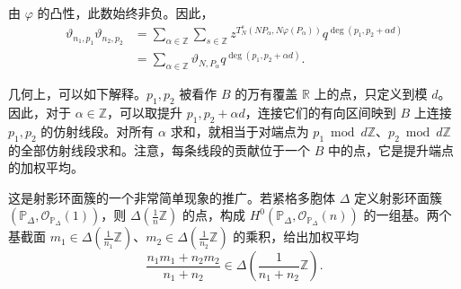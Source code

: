 由 $\varphi$ 的凸性，此数始终非负。因此，
\[
\begin{aligned}
\vartheta_{n_1,p_1}\vartheta_{n_2,p_2}
&=\sum_{\alpha\in\mathbb Z}\sum_{s\in\mathbb Z}
z^{T_N^s(NP_\alpha,N\varphi(P_\alpha))}
q^{\deg(p_1,p_2+\alpha d)}\\
&=\sum_{\alpha\in\mathbb Z}
\vartheta_{N,P_\alpha}q^{\deg(p_1,p_2+\alpha d)}.
\end{aligned}
\]

几何上，可以如下解释。$p_1,p_2$ 被看作 $B$ 的万有覆盖 $\mathbb R$ 上的点，只定义到模 $d$。因此，对于 $\alpha\in\mathbb Z$，可以取提升 $p_1,p_2+\alpha d$，连接它们的有向区间映到 $B$ 上连接 $p_1,p_2$ 的仿射线段。对所有 $\alpha$ 求和，就相当于对端点为 $p_1\bmod d\mathbb Z$、$p_2\bmod d\mathbb Z$ 的全部仿射线段求和。注意，每条线段的贡献位于一个 $B$ 中的点，它是提升端点的加权平均。

\begin{note}[numbered]\label{note:8.18}
这是射影环面簇的一个非常简单现象的推广。若紧格多胞体 $\Delta$ 定义射影环面簇 $(\mathbb P_\Delta,\mathcal O_{\mathbb P_\Delta}(1))$，则 $\Delta(\tfrac1n\mathbb Z)$ 的点，构成 $H^0(\mathbb P_\Delta,\mathcal O_{\mathbb P_\Delta}(n))$ 的一组基。两个基截面 $m_1\in\Delta(\tfrac1{n_1}\mathbb Z)$、$m_2\in\Delta(\tfrac1{n_2}\mathbb Z)$ 的乘积，给出加权平均
\[
\frac{n_1m_1+n_2m_2}{n_1+n_2}
\in\Delta\left(\frac1{n_1+n_2}\mathbb Z\right).
\]
\end{note}

